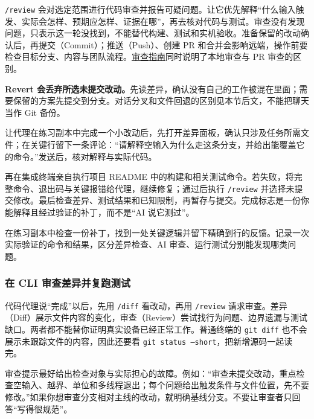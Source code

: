 \texttt{/review} 会对选定范围进行代码审查并报告可疑问题。让它优先解释“什么输入触发、实际会怎样、预期应怎样、证据在哪”，再去核对代码与测试。审查没有发现问题，只表示这一轮没找到，不能替代构建、测试和实机验收。准备保留的改动确认后，再提交（Commit）；推送（Push）、创建 PR 和合并会影响远端，操作前要检查目标分支、内容与团队流程。\href{https://learn.chatgpt.com/docs/code-review}{审查指南}同时说明了本地审查与 PR 审查的区别。

\begin{note}
\textbf{Revert 会丢弃所选未提交改动。}先读差异，确认没有自己的工作被混在里面；需要保留的方案先提交到分支。对话分叉和文件回退的区别见本节后文，不能把聊天当作 Git 备份。
\end{note}

\begin{example}
让代理在练习副本中完成一个小改动后，先打开差异面板，确认只涉及任务所需文件；在关键行留下一条评论：“请解释空输入为什么走这条分支，并给出能覆盖它的命令。”发送后，核对解释与实际代码。

再在集成终端亲自执行项目 README 中的构建和相关测试命令。若失败，将完整命令、退出码与关键报错给代理，继续修复；通过后执行 \texttt{/review} 并选择未提交修改。最后检查差异、测试结果和已知限制，再暂存与提交。完成标志是一份你能解释且经过验证的补丁，而不是“AI 说它测过”。
\end{example}

\begin{exercise}\label{ex:ai-desktop-review}
在练习副本中检查一份补丁，找到一处关键逻辑并留下精确到行的反馈。记录一次实际验证的命令和结果，区分差异检查、AI 审查、运行测试分别能发现哪类问题。
\end{exercise}

\subsubsection{在 CLI 审查差异并复跑测试}

代码代理说“完成”以后，先用 \texttt{/diff} 看改动，再用 \texttt{/review} 请求审查。差异（Diff）展示文件内容的变化，审查（Review）尝试找行为问题、边界遗漏与测试缺口。两者都不能替你证明真实设备已经正常工作。普通终端的 \texttt{git diff} 也不会展示未跟踪文件的内容，因此还要看 \texttt{git status --short}，把新增源码一起读完。

审查提示最好给出检查对象与实际担心的故障。例如：“审查未提交改动，重点检查空输入、越界、单位和多线程退出；每个问题给出触发条件与文件位置，先不要修改。”如果你想审查分支相对主线的改动，就明确基线分支。不要让审查者只回答“写得很规范”。

